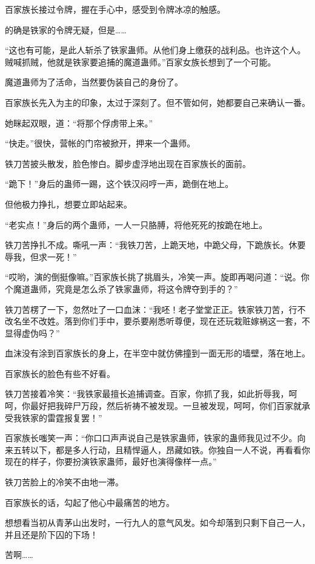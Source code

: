 \begin{this_body}
百家族长接过令牌，握在手心中，感受到令牌冰凉的触感。

的确是铁家的令牌无疑，但是……

“这也有可能，是此人斩杀了铁家蛊师。从他们身上缴获的战利品。也许这个人。贼喊抓贼，他就是铁家要追捕的魔道蛊师。”百家女族长想到了一个可能。

魔道蛊师为了活命，当然要伪装自己的身份了。

百家族长先入为主的印象，太过于深刻了。但不管如何，她都要自己来确认一番。

她眯起双眼，道：“将那个俘虏带上来。”

“快走。”很快，营帐的门帘被掀开，押来一个蛊师。

铁刀苦披头散发，脸色惨白。脚步虚浮地出现在百家族长的面前。

“跪下！”身后的蛊师一踢，这个铁汉闷哼一声，跪倒在地上。

但他极力挣扎，想要立即站起来。

“老实点！”身后的两个蛊师，一人一只胳膊，将他死死的按跪在地上。

铁刀苦挣扎不成。嘶吼一声：“我铁刀苦，上跪天地，中跪父母，下跪族长。休要辱我，但求一死！”

“哎哟，演的倒挺像嘛。”百家族长挑了挑眉头，冷笑一声。旋即再喝问道：“说。你个魔道蛊师，究竟是怎么杀了铁家蛊师，将这令牌夺到手的？”

铁刀苦楞了一下，忽然吐了一口血沫：“我呸！老子堂堂正正。铁家铁刀苦，行不改名坐不改姓。落到你们手中，要杀要剐悉听尊便，现在还玩栽赃嫁祸这一套，不显得虚伪吗？”

血沫没有涂到百家族长的身上，在半空中就仿佛撞到一面无形的墙壁，落在地上。

百家族长的脸色有些不好看。

铁刀苦接着冷笑：“我铁家最擅长追捕调查。百家，你抓了我，如此折辱我，呵呵，你最好把我碎尸万段，然后祈祷不被发现。一旦被发现，呵呵，你们百家就承受我铁家的雷霆报复罢！”

百家族长嗤笑一声：“你口口声声说自己是铁家蛊师，铁家的蛊师我见过不少。向来五转以下，都是多人行动，且精悍逼人，昂藏如铁。你独自一人不说，再看看你现在的样子，你要扮演铁家蛊师，最好也演得像样一点。”

铁刀苦脸上的冷笑不由地一滞。

百家族长的话，勾起了他心中最痛苦的地方。

想想看当初从青茅山出发时，一行九人的意气风发。如今却落到只剩下自己一人，并且还是阶下囚的下场！

苦啊……


\end{this_body}
